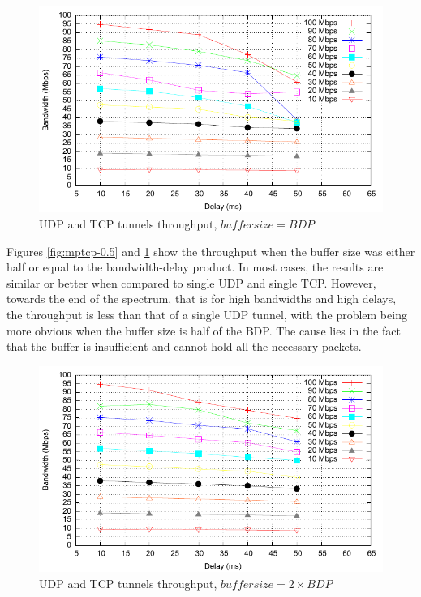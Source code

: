 \begin{figure}
  \centering
  \includegraphics[width=\textwidth]{img/test-mptcp}
  \caption{UDP and TCP tunnels throughput, $buffer size = BDP$}
  \label{fig:mptcp}
\end{figure}

Figures \ref{fig:mptcp-0.5} and \ref{fig:mptcp} show the throughput when the
buffer size was either half or equal to the bandwidth-delay product. In most
cases, the results are similar or better when compared to single UDP and
single TCP. However, towards the end of the spectrum, that is for high
bandwidths and high delays, the throughput is less than that of a single UDP
tunnel, with the problem being more obvious when the buffer size is half of
the BDP. The cause lies in the fact that the buffer is insufficient and cannot
hold all the necessary packets.

\begin{figure}
  \centering
  \includegraphics[width=\textwidth]{img/test-mptcp-2}
  \caption{UDP and TCP tunnels throughput, $buffer size = 2 \times BDP$}
  \label{fig:mptcp-2}
\end{figure}

